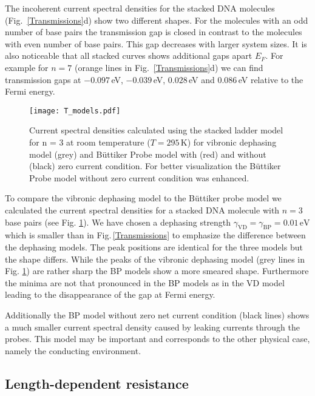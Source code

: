 \documentclass[reprint,superscriptaddress,nofootinbib,amsmath,amssymb,prb,floatfix]{revtex4-1}
\begin{document}
The incoherent current spectral densities for the stacked DNA molecules 
(Fig.~\ref{Transmissions}d) show two different shapes. For the molecules with an 
odd number of base pairs the transmission gap is closed in contrast to the 
molecules with even number of base pairs. This gap decreases with larger system 
sizes. It is also noticeable that all stacked curves shows additional gaps apart 
$E_F$. For example for $n=7$ (orange lines in Fig.~\ref{Transmissions}d) we can 
find transmission gaps at $-0.097$\,eV, $-0.039$\,eV, $0.028$\,eV and 
$0.086$\,eV relative to the Fermi energy. 

\begin{figure}[b]
  \texttt{[image: T\_models.pdf]}
  \caption{Current spectral densities calculated using the stacked ladder model 
for n = 3 at room temperature ($T = 295\,\text{K}$) for vibronic 
dephasing model (grey) and B\"uttiker Probe model with (red) and without 
  (black) zero current condition. For better visualization the 
B\"uttiker Probe model without zero current condition was enhanced.}
  \label{Transmissions_models}
\end{figure} 

To compare the vibronic dephasing model to the B\"uttiker probe model we calculated the current
spectral densities for a stacked DNA molecule with $n=3$ base pairs (see
Fig. \ref{Transmissions_models}). We have chosen a dephasing strength
$\gamma_{\text{VD}} = \gamma_{\text{BP}} = 0.01\,\text{eV}$ which is smaller than in
Fig.\,\ref{Transmissions} to emphasize the difference between the dephasing models. The peak
positions are identical for the three models but the shape differs. While the peaks of the vibronic
dephasing model (grey lines in Fig. \ref{Transmissions_models}) are rather sharp the BP models show
a more smeared shape.  Furthermore the minima are not that pronounced in the BP models as in the VD
model leading to the disappearance of the gap at Fermi energy.

Additionally the BP model without zero net current condition (black lines) shows a much smaller
current spectral density caused by leaking currents through the probes. This model may be important
and corresponds to the other physical case, namely the conducting environment.

\subsection{Length-dependent resistance}
\end{document}
